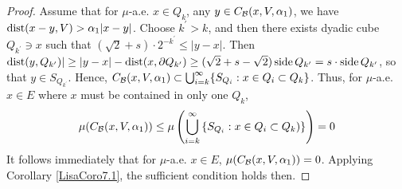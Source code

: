 \begin{proof}
    Assume that for $\mu$-a.e. $x\in Q_k$, any $y\in C_\mathcal B(x, V, \alpha_1)$, we have $\operatorname{dist}(x-y,V)>\alpha_1|x-y|$. {\color{red}Choose $k^\prime > k$, and then there exists dyadic cube $Q_{k^\prime}\ni x$ such that $(\sqrt{2}+s)\cdot 2^{-k^\prime} \leq |y-x|$. Then $\operatorname{dist}(y, Q_{k^\prime})|\geq |y-x|-\operatorname{dist}(x, \partial Q_{k^\prime})\geq (\sqrt{2} +s-\sqrt{2})\operatorname{side} Q_{k^\prime} = s\cdot\operatorname{side} Q_{k^\prime}$, so that $y\in S_{Q_{k^\prime}}$.}
    Hence, $C_\mathcal B(x, V, \alpha_1)\subset \bigcup_{i=k}^\infty \{S_{Q_i}: x\in Q_i\subset Q_k\}$. Thus, for $\mu$-a.e. $x\in E$ where $x$ must be contained in only one $Q_k$,
    \begin{equation*}
        \begin{split}
            \mu(C_\mathcal B(x, V, \alpha_1))\leq \mu\left( \bigcup_{i=k}^\infty \left\{S_{Q_i}:x\in Q_i\subset Q_k \right)\}\right) = 0
        \end{split}
    \end{equation*}
    It follows immediately that for $\mu$-a.e. $x\in E$, $\mu(C_\mathcal B(x, V, \alpha_1)) = 0$. Applying Corollary \ref{LisaCoro7.1}, the sufficient condition holds then.


\end{proof}
